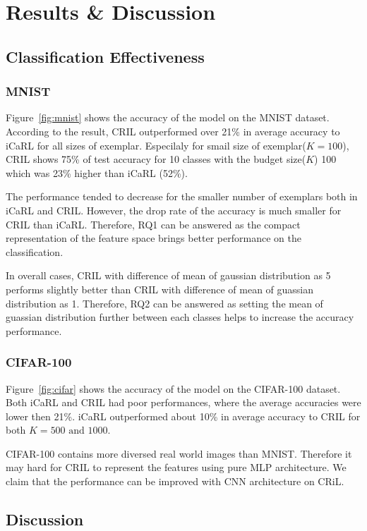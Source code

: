 \section{Results \& Discussion}
\label{sec:results}

\subsection{Classification Effectiveness}
\label{sec:results_effect}

\subsubsection{MNIST}
\label{sec:results_mnist}



Figure~\ref{fig:mnist} shows the accuracy of the model on the MNIST dataset. According to the result, CRIL outperformed over 21\% in average accuracy to iCaRL for all sizes of exemplar. 
Especilaly for smail size of exemplar($K=100$), CRIL shows 75\% of test accuracy for 10 classes with the budget size($K$) 100 which was 23\% higher than iCaRL (52\%).

The performance tended to decrease for the smaller number of exemplars both in iCaRL and CRIL. However, the drop rate of the accuracy is much smaller for CRIL than iCaRL. Therefore, RQ1 can be answered as the compact representation of the feature space brings better performance on the classification.

In overall cases, CRIL with difference of mean of gaussian distribution as 5 performs slightly better than CRIL with difference of mean of guassian distribution as 1. Therefore, RQ2 can be answered as setting the mean of guassian distribution further between each classes helps to increase the accuracy performance.

\subsubsection{CIFAR-100}
\label{sec:results_cifar}


Figure~\ref{fig:cifar} shows the accuracy of the model on the CIFAR-100 dataset. Both iCaRL and CRIL had poor performances, where the average accuracies were lower then 21\%. iCaRL outperformed about 10\% in average accuracy to CRIL for both $K=500\textrm{ and }1000$.

CIFAR-100 contains more diversed real world images than MNIST. Therefore it may hard for CRIL to represent the features using pure MLP architecture. We claim that the performance can be improved with CNN architecture on CRiL.

\subsection{Discussion}


